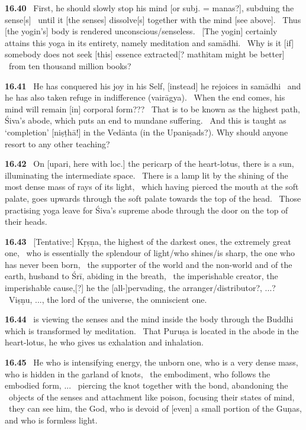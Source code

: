 \documentclass{article}
\begin{document}
\textbf{16.40}%
\ First, he should slowly stop his mind [or subj. = manas?], subduing the sense[s]%
\ until it [the senses] dissolve[s] together with the mind [see above].%
\                                 Thus [the yogin's] body is rendered unconscious/senseless.%
\ [The yogin] certainly attains this yoga in its entirety, namely meditation and samādhi.%
\ Why is it [if] somebody does not seek [this] essence extracted[? mathitam might be better]%
\                                 from ten thousand million books?%


\textbf{16.41}%
\ He has conquered his joy in his Self, [instead] he rejoices in samādhi%
\                         and he has also taken refuge in indifference (vairāgya).%
\ When the end comes, his mind will remain [in] corporal form???%
\ That is to be known as the highest path, Śiva's abode, which puts an end to mundane suffering.%
\ And this is taught as `completion' [niṣṭhā!] in the Vedānta (in the Upaniṣads?). Why should anyone resort to any other teaching?%


\textbf{16.42}%
\ On [upari, here with loc.] the pericarp of the heart-lotus, there is a sun, illuminating the intermediate space.%
\ There is a lamp lit by the shining of the most dense mass of rays of its light,%
\ which having pierced the mouth at the soft palate, goes upwards through the soft palate towards the top of the head.%
\ Those practising yoga leave for Śiva's supreme abode through the door on the top of their heads.%


\textbf{16.43}%
\ [Tentative:] Kṛṣṇa, the highest of the darkest ones, the extremely great one,%
\                         who is essentially the splendour of light/who shines/is sharp, the one who has never been born,%
\ the supporter of the world and the non-world and of the earth, husband to Śrī, abiding in the breath,%
\ the imperishable creator, the imperishable cause,[?] he the [all-]pervading, the arranger/distributor?, ...?%
\ Viṣṇu, ..., the lord of the universe, the omniscient one.%


\textbf{16.44}%
\ is viewing the senses and the mind inside the body through the Buddhi which is transformed by meditation.%
\ That Puruṣa is located in the abode in the heart-lotus, he who gives us exhalation and inhalation.%


\textbf{16.45}%
\ He who is intensifying energy, the unborn one, who is a very dense mass, who is hidden in the garland of knots,%
\ the embodiment, who follows the embodied form, ...%
\ piercing the knot together with the bond, abandoning the%
\                 objects of the senses and attachment like poison, focusing their states of mind,%
\ they can see him, the God, who is devoid of [even] a small portion of the Guṇas, and who is formless light.%
\end{document}
